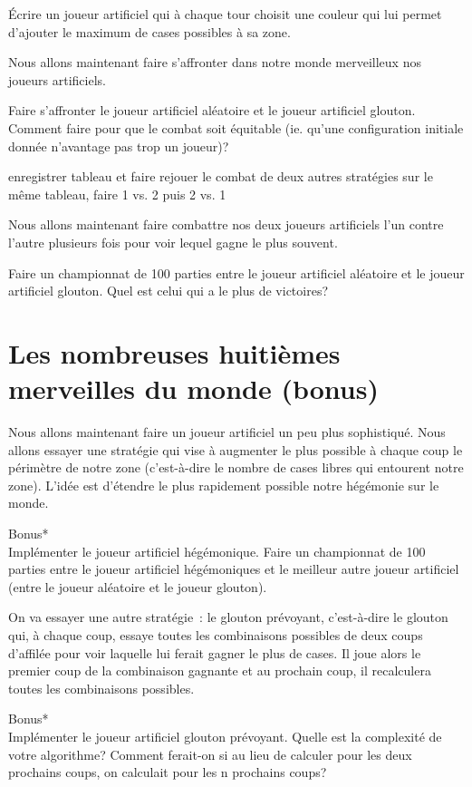 \documentclass[a4paper,10pt]{article}
\begin{document}
\Question \'Ecrire un joueur artificiel qui à chaque tour choisit une couleur qui lui permet d'ajouter le maximum de 
cases possibles à sa zone.

\bigskip
Nous allons maintenant faire s'affronter dans notre monde merveilleux nos joueurs artificiels.

\Question Faire s'affronter le joueur artificiel aléatoire et le joueur artificiel glouton. Comment faire pour que le 
combat soit équitable (ie. qu'une configuration initiale donnée n'avantage pas trop un joueur)?

\begin{Reponse}
enregistrer tableau et faire rejouer le combat de deux autres stratégies sur le même tableau, faire 1 vs. 2 puis 2 vs. 1
\end{Reponse}

Nous allons maintenant faire combattre nos deux joueurs artificiels l'un contre l'autre plusieurs fois pour voir lequel gagne le plus souvent. 

\Question Faire un championnat de 100 parties entre le joueur artificiel aléatoire et le joueur artificiel glouton. 
Quel est celui qui a le plus de victoires?


\section{Les nombreuses huitièmes merveilles du monde (bonus)}
Nous allons maintenant faire un joueur artificiel un peu plus
sophistiqué. Nous allons essayer une stratégie qui vise à augmenter le
plus possible à chaque coup le périmètre de notre zone (c'est-à-dire
le nombre de cases libres qui entourent notre zone). L'idée est
d'étendre le plus rapidement possible notre hégémonie sur le monde.

\Question Bonus*\\
  Implémenter le joueur artificiel hégémonique. Faire un championnat
  de 100 parties entre le joueur artificiel hégémoniques et le
  meilleur autre joueur artificiel (entre le joueur aléatoire et le
  joueur glouton).

On va essayer une autre stratégie~: le glouton prévoyant, c'est-à-dire
le glouton qui, à chaque coup, essaye toutes les combinaisons
possibles de deux coups d'affilée pour voir laquelle lui ferait gagner
le plus de cases. Il joue alors le premier coup de la combinaison
gagnante et au prochain coup, il recalculera toutes les combinaisons
possibles.

\Question Bonus*\\
Implémenter le joueur artificiel glouton prévoyant. Quelle est la complexité de votre algorithme? Comment ferait-on si au lieu de calculer pour les deux prochains coups, on calculait pour les n prochains coups?
\end{document}
